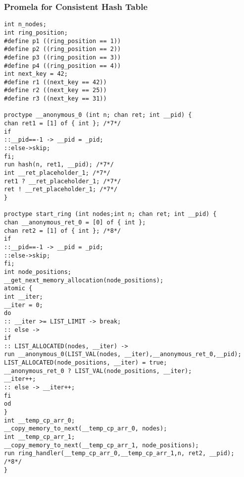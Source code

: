 \subsubsection{Promela for Consistent Hash Table}
\begin{lstlisting}[xleftmargin=.01\linewidth, xrightmargin=0.01\linewidth, caption={Promela of consistent hash table}, label={lst:dht_promela}]
int n_nodes;
int ring_position;
#define p1 ((ring_position == 1))
#define p2 ((ring_position == 2))
#define p3 ((ring_position == 3))
#define p4 ((ring_position == 4))
int next_key = 42;
#define r1 ((next_key == 42))
#define r2 ((next_key == 25))
#define r3 ((next_key == 31))

proctype __anonymous_0 (int n; chan ret; int __pid) {
chan ret1 = [1] of { int }; /*7*/
if
::__pid==-1 -> __pid = _pid;
::else->skip;
fi;
run hash(n, ret1, __pid); /*7*/
int __ret_placeholder_1; /*7*/
ret1 ? __ret_placeholder_1; /*7*/
ret ! __ret_placeholder_1; /*7*/
}

proctype start_ring (int nodes;int n; chan ret; int __pid) {
chan __anonymous_ret_0 = [0] of { int };
chan ret2 = [1] of { int }; /*8*/
if
::__pid==-1 -> __pid = _pid;
::else->skip;
fi;
int node_positions;
__get_next_memory_allocation(node_positions);
atomic {
int __iter;
__iter = 0;
do
:: __iter >= LIST_LIMIT -> break;
:: else ->
if
:: LIST_ALLOCATED(nodes, __iter) ->
run __anonymous_0(LIST_VAL(nodes, __iter),__anonymous_ret_0,__pid);
LIST_ALLOCATED(node_positions, __iter) = true;
__anonymous_ret_0 ? LIST_VAL(node_positions, __iter);
__iter++;
:: else -> __iter++;
fi
od
}
int __temp_cp_arr_0;
__copy_memory_to_next(__temp_cp_arr_0, nodes);
int __temp_cp_arr_1;
__copy_memory_to_next(__temp_cp_arr_1, node_positions);
run ring_handler(__temp_cp_arr_0,__temp_cp_arr_1,n, ret2, __pid); /*8*/
}


\end{lstlisting}

